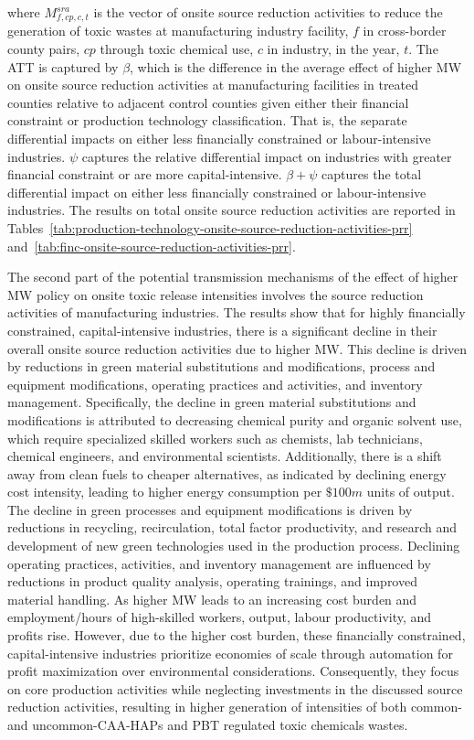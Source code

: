 \documentclass[12pt, english]{article}
\begin{document}
    where $M_{f,cp,c,t}^{sra}$ is the vector of onsite source reduction activities to reduce the generation of toxic wastes at manufacturing industry facility, $f$ in cross-border county pairs, $cp$ through toxic chemical use, $c$ in industry, in the year, $t$. The ATT is captured by $\beta$, which is the difference in the average effect of higher MW on onsite source reduction activities at manufacturing facilities in treated counties relative to adjacent control counties given either their financial constraint or production technology classification. That is, the separate differential impacts on either less financially constrained or labour-intensive industries. $\psi$ captures the relative differential impact on industries with greater financial constraint or are more capital-intensive. $\beta + \psi$ captures the total differential impact on either less financially constrained or labour-intensive industries.
    The results on total onsite source reduction activities are reported in Tables~\ref{tab:production-technology-onsite-source-reduction-activities-prr} and~\ref{tab:finc-onsite-source-reduction-activities-prr}.

    The second part of the potential transmission mechanisms of the effect of higher MW policy on onsite toxic release intensities involves the source reduction activities of manufacturing industries. The results show that for highly financially constrained, capital-intensive industries, there is a significant decline in their overall onsite source reduction activities due to higher MW. This decline is driven by reductions in green material substitutions and modifications, process and equipment modifications, operating practices and activities, and inventory management. Specifically, the decline in green material substitutions and modifications is attributed to decreasing chemical purity and organic solvent use, which require specialized skilled workers such as chemists, lab technicians, chemical engineers, and environmental scientists. Additionally, there is a shift away from clean fuels to cheaper alternatives, as indicated by declining energy cost intensity, leading to higher energy consumption per $\$100m$ units of output. The decline in green processes and equipment modifications is driven by reductions in recycling, recirculation, total factor productivity, and research and development of new green technologies used in the production process. Declining operating practices, activities, and inventory management are influenced by reductions in product quality analysis, operating trainings, and improved material handling. As higher MW leads to an increasing cost burden and employment/hours of high-skilled workers, output, labour productivity, and profits rise. However, due to the higher cost burden, these financially constrained, capital-intensive industries prioritize economies of scale through automation for profit maximization over environmental considerations. Consequently, they focus on core production activities while neglecting investments in the discussed source reduction activities, resulting in higher generation of intensities of both common- and uncommon-CAA-HAPs and PBT regulated toxic chemicals wastes.
\end{document}
